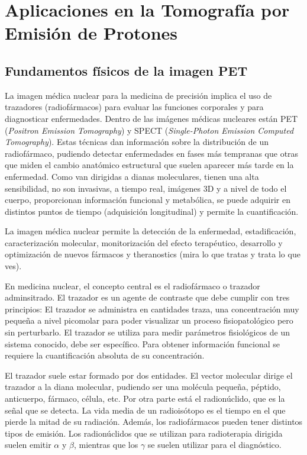 \chapter{Aplicaciones en la Tomografía por Emisión de Protones}
\section{Fundamentos físicos de la imagen PET}
La imagen médica nuclear para la medicina de precisión implica el uso de trazadores (radiofármacos) para evaluar las funciones corporales y para diagnosticar enfermedades. Dentro de las imágenes médicas nucleares están PET (\textit{Positron Emission Tomography}) y SPECT (\textit{Single-Photon Emission Computed Tomography}). Estas técnicas dan información sobre la distribución de un radiofármaco, pudiendo detectar enfermedades en fases más tempranas que otras que miden el cambio anatómico estructural que suelen aparecer más tarde en la enfermedad. Como van dirigidas a dianas moleculares, tienen una alta sensibilidad, no son invasivas, a tiempo real, imágenes 3D y a nivel de todo el cuerpo, proporcionan información funcional y metabólica, se puede adquirir en distintos puntos de tiempo (adquisición longitudinal) y permite la cuantificación.

La imagen médica nuclear permite la detección de la enfermedad, estadificación, caracterización molecular, monitorización del efecto terapéutico, desarrollo y optimización de nuevos fármacos y theranostics (mira lo que tratas y trata lo que ves).

En medicina nuclear, el concepto central es el radiofármaco o trazador adminsitrado. El trazador es un agente de contraste que debe cumplir con tres principios:
El trazador se administra en cantidades traza, una concentración muy pequeña a nivel picomolar para poder visualizar un proceso fisiopatológico pero sin perturbarlo. El trazador se utiliza para medir parámetros fisiológicos de un sistema conocido, debe ser específico. Para obtener información funcional se requiere la cuantificación absoluta de su concentración. 

El trazador suele estar formado por dos entidades. El vector molecular dirige el trazador a la diana molecular, pudiendo ser una molécula pequeña, péptido, anticuerpo, fármaco, célula, etc. Por otra parte está el radionúclido, que es la señal que se detecta. La vida media de un radioisótopo es el tiempo en el que pierde la mitad de su radiación. Además, los radiofármacos pueden tener distintos tipos de emisión. Los radionúclidos que se utilizan para radioterapia dirigida suelen emitir $\alpha$ y $\beta$, mientras que los $\gamma$ se suelen utilizar para el diagnóstico. 

